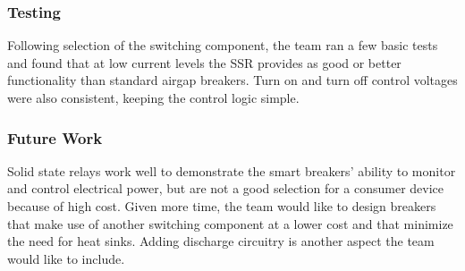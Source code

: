 \subsubsection{Testing}
Following selection of the switching component, the team ran a few basic tests and found that at low current levels the SSR provides as good or better functionality than standard air\-gap breakers. Turn on and turn off control voltages were also consistent, keeping the control logic simple.

\subsubsection{Future Work}
Solid state relays work well to demonstrate the smart breakers' ability to monitor and control electrical power, but are not a good selection for a consumer device because of high cost. Given more time, the team would like to design breakers that make use of another switching component at a lower cost and that minimize the need for heat sinks. Adding discharge circuitry is another aspect the team would like to include. 





